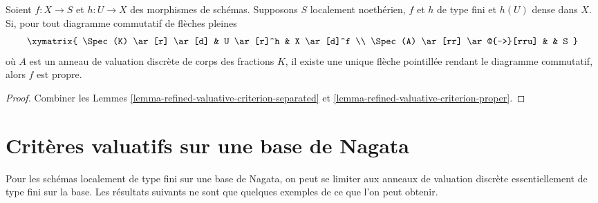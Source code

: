 \begin{lemma}
\label{lemma-refined-valuative-criterion-universally-closed}
Soient $f : X \to S$ et $h : U \to X$ des morphismes de schémas.
Supposons $S$ localement noethérien, $f$ et $h$ de type fini et
$h(U)$ dense dans $X$. Si, pour tout diagramme commutatif de flèches pleines
$$
\xymatrix{
\Spec(K) \ar[r] \ar[d] & U \ar[r]^h & X \ar[d]^f \\
\Spec(A) \ar[rr] \ar@{-->}[rru] & & S
}
$$
où $A$ est un anneau de valuation discrète de corps des fractions $K$,
il existe une unique flèche pointillée rendant le diagramme commutatif, alors $f$ est propre.
\end{lemma}

\begin{proof}
Combiner les Lemmes \ref{lemma-refined-valuative-criterion-separated} et
\ref{lemma-refined-valuative-criterion-proper}.
\end{proof}

\section{Critères valuatifs sur une base de Nagata}
\label{section-nagata-valuative}

\noindent
Pour les schémas localement de type fini sur une
base de Nagata, on peut se limiter aux anneaux de valuation discrète
essentiellement de type fini sur la base.
Les résultats suivants ne sont que quelques exemples de ce que l'on peut obtenir.

